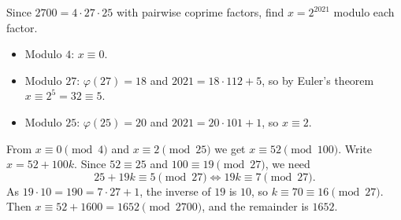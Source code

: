 Since $2700=4\cdot27\cdot25$ with pairwise coprime factors, find $x=2^{2021}$ modulo each factor.
\begin{itemize}
\item Modulo $4$: $x\equiv0$.
\item Modulo $27$: $\varphi(27)=18$ and $2021=18\cdot112+5$, so by Euler's theorem $x\equiv2^5=32\equiv5$.
\item Modulo $25$: $\varphi(25)=20$ and $2021=20\cdot101+1$, so $x\equiv2$.
\end{itemize}
From $x\equiv0\pmod4$ and $x\equiv2\pmod{25}$ we get $x\equiv52\pmod{100}$. Write $x=52+100k$. Since $52\equiv25$ and $100\equiv19\pmod{27}$, we need
\[25+19k\equiv5\pmod{27}\iff19k\equiv7\pmod{27}.\]
As $19\cdot10=190=7\cdot27+1$, the inverse of $19$ is $10$, so $k\equiv70\equiv16\pmod{27}$. Then $x\equiv52+1600=1652\pmod{2700}$, and the remainder is $\boxed{1652}$.
